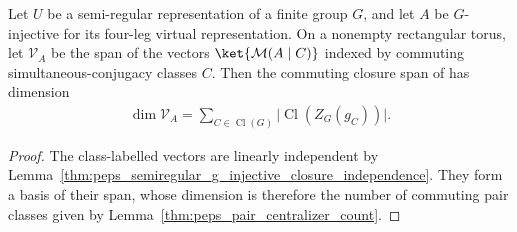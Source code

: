 \begin{lemma}%
    \label{thm:peps_g_injective_closure_dimension}
    \leanok
    Let $U$ be a semi-regular representation of a finite group $G$,
    and let $A$ be $G$-injective for its four-leg virtual representation.
    On a nonempty rectangular torus, let $\mathcal V_A$ be the span
    of the vectors $\ket{\mathcal M(A\mid C)}$ indexed by commuting
    simultaneous-conjugacy classes $C$. Then the commuting closure span of
    \cite[Theorem~5.9]{Schuch2010PEPS} has dimension
    \begin{align}
        \dim\mathcal V_A
        =\sum_{C\in\operatorname{Cl}(G)}
        \bigl|\operatorname{Cl}(Z_G(g_C))\bigr|.
    \end{align}
\end{lemma}

\begin{proof}\leanok
    The class-labelled vectors are linearly independent by
    Lemma~\ref{thm:peps_semiregular_g_injective_closure_independence}.
    They form a basis of their span, whose dimension is therefore
    the number of commuting pair classes given by
    Lemma~\ref{thm:peps_pair_centralizer_count}.
\end{proof}
